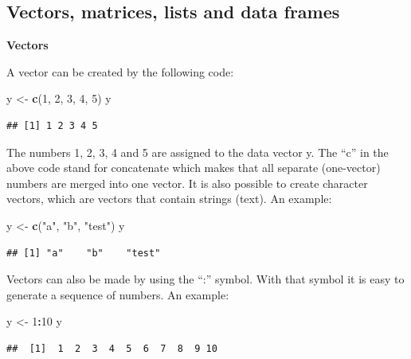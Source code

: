\documentclass[]{book}
\newenvironment{Shaded}{\begin{snugshade}}{\end{snugshade}}
\newcommand{\KeywordTok}[1]{\textcolor[rgb]{0.13,0.29,0.53}{\textbf{#1}}}
\newcommand{\DecValTok}[1]{\textcolor[rgb]{0.00,0.00,0.81}{#1}}
\newcommand{\StringTok}[1]{\textcolor[rgb]{0.31,0.60,0.02}{#1}}
\newcommand{\OperatorTok}[1]{\textcolor[rgb]{0.81,0.36,0.00}{\textbf{#1}}}
\newcommand{\NormalTok}[1]{#1}
\begin{document}
\subsection{Vectors, matrices, lists and data
frames}\label{vectors-matrices-lists-and-data-frames}

\textbf{Vectors}

A vector can be created by the following code:

\begin{Shaded}
\begin{Highlighting}[]
\NormalTok{y <-}\StringTok{ }\KeywordTok{c}\NormalTok{(}\DecValTok{1}\NormalTok{, }\DecValTok{2}\NormalTok{, }\DecValTok{3}\NormalTok{, }\DecValTok{4}\NormalTok{, }\DecValTok{5}\NormalTok{)}
\NormalTok{y}
\end{Highlighting}
\end{Shaded}

\begin{verbatim}
## [1] 1 2 3 4 5
\end{verbatim}

The numbers 1, 2, 3, 4 and 5 are assigned to the data vector y. The
``c'' in the above code stand for concatenate which makes that all
separate (one-vector) numbers are merged into one vector. It is also
possible to create character vectors, which are vectors that contain
strings (text). An example:

\begin{Shaded}
\begin{Highlighting}[]
\NormalTok{y <-}\StringTok{ }\KeywordTok{c}\NormalTok{(}\StringTok{"a"}\NormalTok{, }\StringTok{"b"}\NormalTok{, }\StringTok{"test"}\NormalTok{)}
\NormalTok{y}
\end{Highlighting}
\end{Shaded}

\begin{verbatim}
## [1] "a"    "b"    "test"
\end{verbatim}

Vectors can also be made by using the ``:'' symbol. With that symbol it
is easy to generate a sequence of numbers. An example:

\begin{Shaded}
\begin{Highlighting}[]
\NormalTok{y <-}\StringTok{ }\DecValTok{1}\OperatorTok{:}\DecValTok{10}
\NormalTok{y}
\end{Highlighting}
\end{Shaded}

\begin{verbatim}
##  [1]  1  2  3  4  5  6  7  8  9 10
\end{verbatim}
\end{document}
